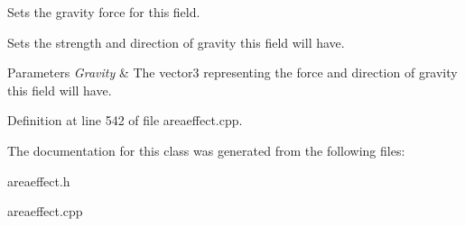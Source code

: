 Sets the gravity force for this field. 

Sets the strength and direction of gravity this field will have. 
\begin{DoxyParams}{Parameters}
{\em Gravity} & The vector3 representing the force and direction of gravity this field will have. \\
\hline
\end{DoxyParams}


Definition at line 542 of file areaeffect.cpp.



The documentation for this class was generated from the following files:\begin{DoxyCompactItemize}
\item 
areaeffect.h\item 
areaeffect.cpp\end{DoxyCompactItemize}
